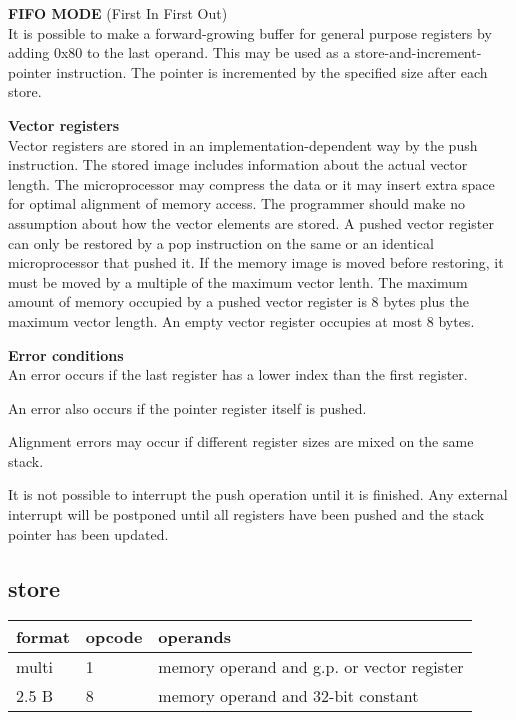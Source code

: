 \documentclass[forwardcom.tex]{subfiles}
\begin{document}
\textbf{FIFO MODE} (First In First Out) \\
It is possible to make a forward-growing buffer for general purpose registers by adding 0x80 to the last operand. This may be used as a store-and-increment-pointer instruction. The pointer is incremented by the specified size after each store.
\vv

\textbf{Vector registers}\\
Vector registers are stored in an implementation-dependent way by the push instruction. The stored image includes information about the actual vector length. 
The microprocessor may compress the data or it may insert extra space for optimal alignment of memory access. The programmer should make no assumption about how the vector elements are stored. A pushed vector register can only be restored by a pop instruction on the same or an identical microprocessor that pushed it. If the memory image is moved before restoring, it must be moved by a multiple of the maximum vector lenth. The maximum amount of memory occupied by a pushed vector register is 8 bytes plus the maximum vector length. An empty vector register occupies at most 8 bytes.
\vv

\textbf{Error conditions}\\
An error occurs if the last register has a lower index than the first register.
\vv

An error also occurs if the pointer register itself is pushed.
\vv

Alignment errors may occur if different register sizes are mixed on the same stack.
\vv

It is not possible to interrupt the push operation until it is finished. Any external interrupt will be postponed until all registers have been pushed and the stack pointer has been updated.
\vv


\subsection{store}
\label{table:storeInstruction}
\begin{tabular}{|p{12mm}|p{15mm}|p{100mm}|}
\hline
\bfseries format & \bfseries opcode & \bfseries operands \\ \hline
multi &  1 & memory operand and g.p. or vector register \\ \hline
2.5 B &  8 & memory operand and 32-bit constant \\ \hline
\end{tabular}
\vv
\end{document}
